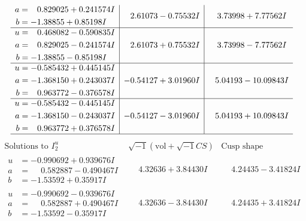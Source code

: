 \documentclass[1p]{elsarticle_modified}
\theoremstyle{definition}
\newcommand{\I}{\sqrt{-1}}
\begin{document}
$$\begin{array}{c|c|c}
\begin{aligned}
a &= \phantom{-}0.829025 + 0.241574 I \\
b &= -1.38855 + 0.85198 I\end{aligned}
 & \phantom{-}2.61073 - 0.75532 I & \phantom{-}3.73998 + 7.77562 I \\ \hline\begin{aligned}
u &= \phantom{-}0.468082 - 0.590835 I \\
a &= \phantom{-}0.829025 - 0.241574 I \\
b &= -1.38855 - 0.85198 I\end{aligned}
 & \phantom{-}2.61073 + 0.75532 I & \phantom{-}3.73998 - 7.77562 I \\ \hline\begin{aligned}
u &= -0.585432 + 0.445145 I \\
a &= -1.368150 + 0.243037 I \\
b &= \phantom{-}0.963772 - 0.376578 I\end{aligned}
 & -0.54127 + 3.01960 I & \phantom{-}5.04193 - 10.09843 I \\ \hline\begin{aligned}
u &= -0.585432 - 0.445145 I \\
a &= -1.368150 - 0.243037 I \\
b &= \phantom{-}0.963772 + 0.376578 I\end{aligned}
 & -0.54127 - 3.01960 I & \phantom{-}5.04193 + 10.09843 I\\
 \hline 
 \end{array}$$\newpage$$\begin{array}{c|c|c}  
\text{Solutions to }I^u_{2}& \I (\text{vol} + \sqrt{-1}CS) & \text{Cusp shape}\\
 \hline 
\begin{aligned}
u &= -0.990692 + 0.939676 I \\
a &= \phantom{-}0.582887 - 0.490467 I \\
b &= -1.53592 + 0.35917 I\end{aligned}
 & \phantom{-}4.32636 + 3.84430 I & \phantom{-}4.24435 - 3.41824 I \\ \hline\begin{aligned}
u &= -0.990692 - 0.939676 I \\
a &= \phantom{-}0.582887 + 0.490467 I \\
b &= -1.53592 - 0.35917 I\end{aligned}
 & \phantom{-}4.32636 - 3.84430 I & \phantom{-}4.24435 + 3.41824 I \\ \hline\begin{aligned}

\end{aligned}
\end{array}$$
\end{document}
